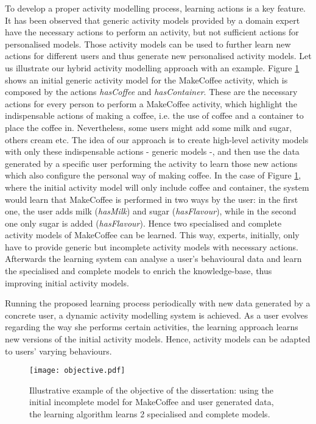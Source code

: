 To develop a proper activity modelling process, learning actions is a key feature. It has been observed that generic activity models provided by a domain expert have the necessary actions to perform an activity, but not sufficient actions for personalised models. Those activity models can be used to further learn new actions for different users and thus generate new personalised activity models. Let us illustrate our hybrid activity modelling approach with an example. Figure \ref{fig-objective} shows an initial generic activity model for the MakeCoffee activity, which is composed by the actions \textit{hasCoffee} and \textit{hasContainer}. These are the necessary actions for every person to perform a MakeCoffee activity, which highlight the indispensable actions of making a coffee, i.e. the use of coffee and a container to place the coffee in. Nevertheless, some users might add some milk and sugar, others cream etc. The idea of our approach is to create high-level activity models with only these indispensable actions - generic models -, and then use the data generated by a specific user performing the activity to learn those new actions which also configure the personal way of making coffee. In the case of Figure \ref{fig-objective}, where the initial activity model will only include coffee and container, the system would learn that MakeCoffee is performed in two ways by the user: in the first one, the user adds milk (\textit{hasMilk}) and sugar (\textit{hasFlavour}), while in the second one only sugar is added (\textit{hasFlavour}). Hence two specialised and complete activity models of MakeCoffee can be learned. This way, experts, initially, only have to provide generic but incomplete activity models with necessary actions. Afterwards the learning system can analyse a user's behavioural data and learn the specialised and complete models to enrich the knowledge-base, thus improving initial activity models.

Running the proposed learning process periodically with new data generated by a concrete user, a dynamic activity modelling system is achieved. As a user evolves regarding the way she performs certain activities, the learning approach learns new versions of the initial activity models. Hence, activity models can be adapted to users' varying behaviours.

\begin{figure}[htbp]
\centering
\texttt{[image: objective.pdf]}
    \caption{Illustrative example of the objective of the dissertation: using the initial incomplete model for MakeCoffee and user generated data, the learning algorithm learns 2 specialised and complete models.}
    \label{fig-objective}
\end{figure}

